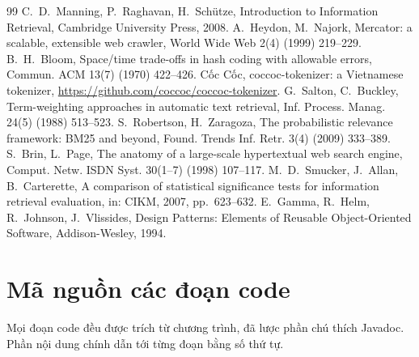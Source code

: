 \documentclass[9pt,twocolumn,a4paper]{extarticle}
\begin{document}
\begin{thebibliography}{99}\footnotesize\itemsep0pt\parskip0pt
 C.~D.~Manning, P.~Raghavan, H.~Sch{\"u}tze, Introduction to Information Retrieval, Cambridge University Press, 2008.
 A.~Heydon, M.~Najork, Mercator: a scalable, extensible web crawler, World Wide Web 2(4) (1999) 219--229.
 B.~H.~Bloom, Space/time trade-offs in hash coding with allowable errors, Commun. ACM 13(7) (1970) 422--426.
 Cốc Cốc, coccoc-tokenizer: a Vietnamese tokenizer, \url{https://github.com/coccoc/coccoc-tokenizer}.
 G.~Salton, C.~Buckley, Term-weighting approaches in automatic text retrieval, Inf. Process. Manag. 24(5) (1988) 513--523.
 S.~Robertson, H.~Zaragoza, The probabilistic relevance framework: BM25 and beyond, Found. Trends Inf. Retr. 3(4) (2009) 333--389.
 S.~Brin, L.~Page, The anatomy of a large-scale hypertextual web search engine, Comput. Netw. ISDN Syst. 30(1--7) (1998) 107--117.
 M.~D.~Smucker, J.~Allan, B.~Carterette, A comparison of statistical significance tests for information retrieval evaluation, in: CIKM, 2007, pp.~623--632.
 E.~Gamma, R.~Helm, R.~Johnson, J.~Vlissides, Design Patterns: Elements of Reusable Object-Oriented Software, Addison-Wesley, 1994.
\end{thebibliography}


\clearpage
\onecolumn
\appendix
{}
\section{Mã nguồn các đoạn code}
\label{app:code}
Mọi đoạn code đều được trích từ chương trình, đã lược phần chú thích Javadoc. Phần nội dung chính dẫn tới từng đoạn bằng số thứ tự.
\end{document}
